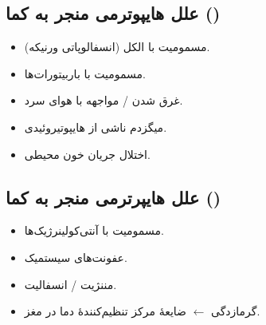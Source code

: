 \documentclass[11pt,a4paper]{article}
\providecommand{\en}[1]{\lr{#1}}
\newcommand{\comaarr}{\ensuremath{\leftarrow}}
\begin{document}
\subsection*{علل هایپوترمی منجر به کما (\en{$T\downarrow$})}
\begin{itemize}
  \item مسمومیت با الکل (انسفالوپاتی ورنیکه).
  \item مسمومیت با باربیتورات‌ها.
  \item غرق شدن / مواجهه با هوای سرد.
  \item میگزدم ناشی از هایپوتیروئیدی.
  \item اختلال جریان خون محیطی.
\end{itemize}
\subsection*{علل هایپرترمی منجر به کما (\en{$T\uparrow$})}
\begin{itemize}
  \item مسمومیت با آنتی‌کولینرژیک‌ها.
  \item عفونت‌های سیستمیک.
  \item مننژیت / انسفالیت.
  \item گرمازدگی \comaarr{} ضایعهٔ مرکز تنظیم‌کنندهٔ دما در مغز.
\end{itemize}
\end{document}
